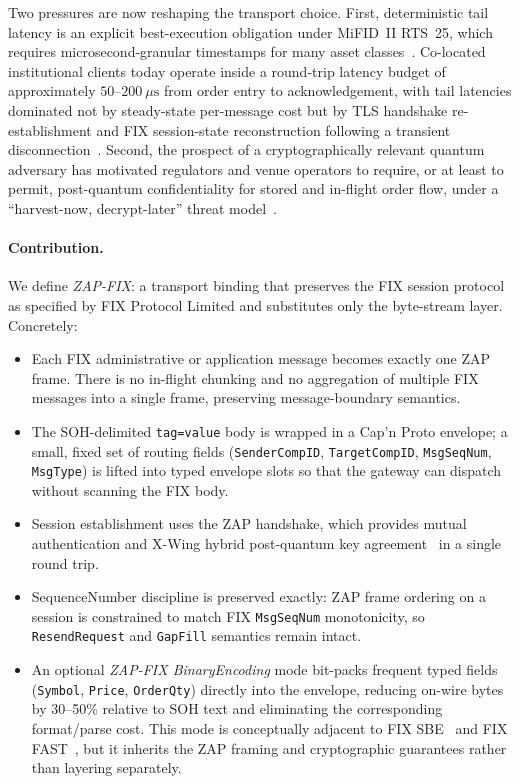 \documentclass[11pt,a4paper]{article}
\begin{document}
Two pressures are now reshaping the transport choice. First,
deterministic tail latency is an explicit best-execution
obligation under MiFID~II RTS~25, which requires
microsecond-granular timestamps for many asset
classes~\cite{rts25}. Co-located institutional clients today operate
inside a round-trip latency budget of approximately
$50$--$200~\mu\mathrm{s}$ from order entry to acknowledgement,
with tail latencies dominated not by steady-state per-message cost
but by TLS handshake re-establishment and FIX session-state
reconstruction following a transient
disconnection~\cite{hasbrouck2013,kissell2013}. Second, the prospect
of a cryptographically relevant quantum adversary has motivated
regulators and venue operators to require, or at least to permit,
post-quantum confidentiality for stored and in-flight order flow,
under a ``harvest-now, decrypt-later'' threat
model~\cite{nistpqc,nistsp80056c}.

\paragraph{Contribution.}
We define \emph{ZAP-FIX}: a transport binding that preserves the FIX
session protocol as specified by FIX Protocol Limited and
substitutes only the byte-stream layer. Concretely:

\begin{itemize}
  \item Each FIX administrative or application message becomes
        exactly one ZAP frame. There is no in-flight chunking and
        no aggregation of multiple FIX messages into a single
        frame, preserving message-boundary semantics.
  \item The SOH-delimited \texttt{tag=value} body is wrapped in a
        Cap'n Proto envelope; a small, fixed set of routing fields
        (\texttt{SenderCompID}, \texttt{TargetCompID},
        \texttt{MsgSeqNum}, \texttt{MsgType}) is lifted into typed
        envelope slots so that the gateway can dispatch without
        scanning the FIX body.
  \item Session establishment uses the ZAP handshake, which provides
        mutual authentication and X-Wing hybrid post-quantum key
        agreement~\cite{xwing,kyber} in a single round trip.
  \item SequenceNumber discipline is preserved exactly: ZAP frame
        ordering on a session is constrained to match FIX
        \texttt{MsgSeqNum} monotonicity, so \texttt{ResendRequest}
        and \texttt{GapFill} semantics remain intact.
  \item An optional \emph{ZAP-FIX BinaryEncoding} mode bit-packs
        frequent typed fields (\texttt{Symbol}, \texttt{Price},
        \texttt{OrderQty}) directly into the envelope, reducing
        on-wire bytes by 30--50\% relative to SOH text and
        eliminating the corresponding format/parse cost. This mode
        is conceptually adjacent to FIX SBE~\cite{fixsbe} and FIX
        FAST~\cite{fixfast}, but it inherits the ZAP framing and
        cryptographic guarantees rather than layering separately.
\end{itemize}
\end{document}
